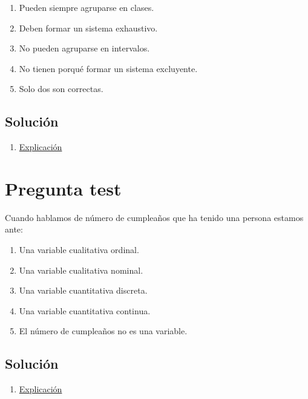 \documentclass[
]{book}
\providecommand{\tightlist}{%
  \setlength{\itemsep}{0pt}\setlength{\parskip}{0pt}}
\begin{document}
\begin{enumerate}
\def\labelenumi{\alph{enumi})}
\tightlist
\item
  Pueden siempre agruparse en clases.
\item
  Deben formar un sistema exhaustivo.
\item
  No pueden agruparse en intervalos.
\item
  No tienen porqué formar un sistema excluyente.
\item
  Solo dos son correctas.
\end{enumerate}

\hypertarget{soluciuxf3n-13}{%
\subsection{Solución}\label{soluciuxf3n-13}}

\begin{enumerate}
\def\labelenumi{\alph{enumi})}
\setcounter{enumi}{1}
\tightlist
\item
  \href{https://1fjmanzano.github.io/bioestadistica/tipos-de-variables.html}{Explicación}
\end{enumerate}

\hypertarget{pregunta-test-14}{%
\section{Pregunta test}\label{pregunta-test-14}}

Cuando hablamos de número de cumpleaños que ha tenido una persona estamos ante:

\begin{enumerate}
\def\labelenumi{\alph{enumi})}
\tightlist
\item
  Una variable cualitativa ordinal.
\item
  Una variable cualitativa nominal.
\item
  Una variable cuantitativa discreta.
\item
  Una variable cuantitativa continua.
\item
  El número de cumpleaños no es una variable.
\end{enumerate}

\hypertarget{soluciuxf3n-14}{%
\subsection{Solución}\label{soluciuxf3n-14}}

\begin{enumerate}
\def\labelenumi{\alph{enumi})}
\setcounter{enumi}{2}
\tightlist
\item
  \href{https://1fjmanzano.github.io/bioestadistica/tipos-de-variables.html}{Explicación}
\end{enumerate}
\end{document}
